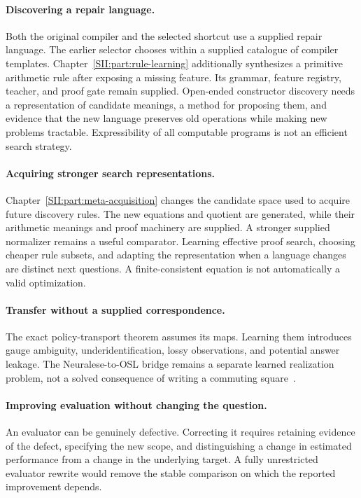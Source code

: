 \paragraph{Discovering a repair language.}
Both the original compiler and the selected shortcut use a supplied repair language. The earlier selector chooses within a supplied catalogue of compiler templates. Chapter~\ref{SII:part:rule-learning} additionally synthesizes a primitive arithmetic rule after exposing a missing feature. Its grammar, feature registry, teacher, and proof gate remain supplied. Open-ended constructor discovery needs a representation of candidate meanings, a method for proposing them, and evidence that the new language preserves old operations while making new problems tractable. Expressibility of all computable programs is not an efficient search strategy.

\paragraph{Acquiring stronger search representations.}
Chapter~\ref{SII:part:meta-acquisition} changes the candidate space used to acquire future discovery rules. The new equations and quotient are generated, while their arithmetic meanings and proof machinery are supplied. A stronger supplied normalizer remains a useful comparator. Learning effective proof search, choosing cheaper rule subsets, and adapting the representation when a language changes are distinct next questions. A finite-consistent equation is not automatically a valid optimization.

\paragraph{Transfer without a supplied correspondence.}
The exact policy-transport theorem assumes its maps. Learning them introduces gauge ambiguity, underidentification, lossy observations, and potential answer leakage. The Neuralese-to-OSL bridge remains a separate learned realization problem, not a solved consequence of writing a commuting square~\cite{SII:neuralese}.

\paragraph{Improving evaluation without changing the question.}
An evaluator can be genuinely defective. Correcting it requires retaining evidence of the defect, specifying the new scope, and distinguishing a change in estimated performance from a change in the underlying target. A fully unrestricted evaluator rewrite would remove the stable comparison on which the reported improvement depends.

